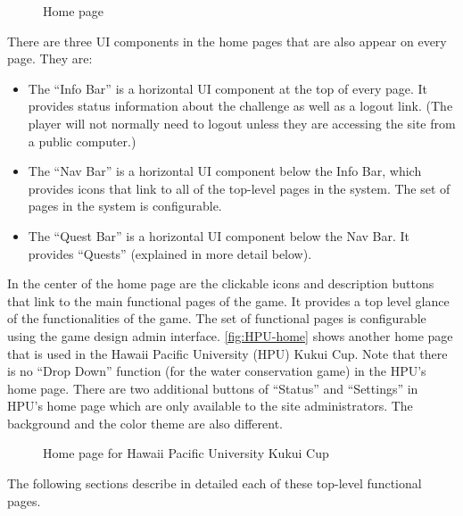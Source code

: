 \begin{figure}[!ht]
\begin{center}
\end{center}
\caption{Home page}
\label{fig:makahiki-home}
\end{figure}

There are three UI components in the home pages that are also appear on every page. They are:

\begin{itemize}
  \item The ``Info Bar'' is a horizontal UI component at the top of every page. It provides status information about the challenge as well as a logout link. (The player will not normally need to logout unless they are accessing the site from a public computer.)
  \item The ``Nav Bar'' is a horizontal UI component below the Info Bar, which provides icons that link to all of the top-level pages in the system. The set of pages in the system is configurable.
  \item The ``Quest Bar'' is a horizontal UI component below the Nav Bar. It provides ``Quests'' (explained in more detail below).
\end{itemize}

In the center of the home page are the clickable icons and description buttons that link to the main functional pages of the game. It provides a top level glance of the functionalities of the game. The set of functional pages is configurable using the game design admin interface. \autoref{fig:HPU-home} shows another home page that is used in the Hawaii Pacific University (HPU) Kukui Cup. Note that there is no ``Drop Down'' function (for the water conservation game) in the HPU's home page.  There are two additional buttons of ``Status'' and ``Settings'' in HPU's home page which are only available to the site administrators. The background and the color theme are also different.

\begin{figure}[!ht]
\begin{center}
\end{center}
\caption{Home page for Hawaii Pacific University Kukui Cup}
\label{fig:HPU-home}
\end{figure}

The following sections describe in detailed each of these top-level functional pages.

